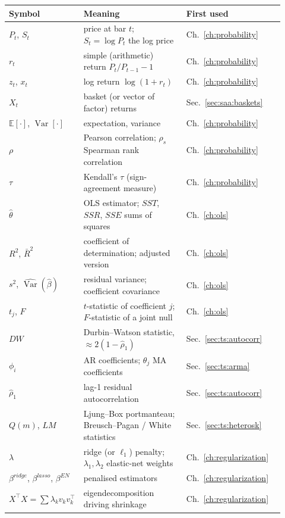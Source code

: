 \begin{center}
\renewcommand{\arraystretch}{1.35}
\small
\begin{tabular}{p{0.13\linewidth}p{0.42\linewidth}p{0.37\linewidth}}
\toprule
Symbol & Meaning & First used \\
\midrule
$P_t$, $S_t$ & price at bar $t$; $S_t=\log P_t$ the log price & Ch.~\ref{ch:probability} \\
$r_t$ & simple (arithmetic) return $P_t/P_{t-1}-1$ & Ch.~\ref{ch:probability} \\
$z_t$, $x_t$ & log return $\log(1+r_t)$ & Ch.~\ref{ch:probability} \\
$X_t$ & basket (or vector of factor) returns & Sec.~\ref{sec:saa:baskets} \\
$\mathbb{E}[\cdot]$, $\operatorname{Var}[\cdot]$ & expectation, variance & Ch.~\ref{ch:probability} \\
$\rho$ & Pearson correlation; $\rho_s$ Spearman rank correlation & Ch.~\ref{ch:probability} \\
$\tau$ & Kendall's $\tau$ (sign-agreement measure) & Ch.~\ref{ch:probability} \\
$\hat\theta$ & OLS estimator; $SST$, $SSR$, $SSE$ sums of squares & Ch.~\ref{ch:ols} \\
$R^2$, $\bar R^2$ & coefficient of determination; adjusted version & Ch.~\ref{ch:ols} \\
$s^2$, $\widehat{\operatorname{Var}}(\hat\beta)$ & residual variance; coefficient covariance & Ch.~\ref{ch:ols} \\
$t_j$, $F$ & $t$-statistic of coefficient $j$; $F$-statistic of a joint null & Ch.~\ref{ch:ols} \\
$DW$ & Durbin--Watson statistic, $\approx 2(1-\hat\rho_1)$ & Sec.~\ref{sec:ts:autocorr} \\
$\phi_i$ & AR coefficients; $\theta_j$ MA coefficients & Sec.~\ref{sec:ts:arma} \\
$\hat\rho_1$ & lag-1 residual autocorrelation & Sec.~\ref{sec:ts:autocorr} \\
$Q(m)$, $LM$ & Ljung--Box portmanteau; Breusch--Pagan / White statistics & Sec.~\ref{sec:ts:heterosk} \\
$\lambda$ & ridge (or $\ell_1$) penalty; $\lambda_1,\lambda_2$ elastic-net weights & Ch.~\ref{ch:regularization} \\
$\beta^{ridge}$, $\beta^{lasso}$, $\beta^{EN}$ & penalised estimators & Ch.~\ref{ch:regularization} \\
$X^\top X=\sum\lambda_k v_k v_k^\top$ & eigendecomposition driving shrinkage & Ch.~\ref{ch:regularization} \\

\end{tabular}
\end{center}
